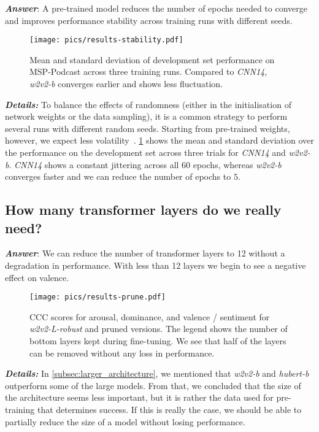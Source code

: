\documentclass{article}
\newcommand\cnn{\mbox{\emph{CNN14}}}
\newcommand\wbase{\mbox{\emph{w2v2-b}}}
\newcommand\hbase{\mbox{\emph{hubert-b}}}
\newcommand\wrobust{\mbox{\emph{w2v2-L-robust}}}
\newcommand\msppodcast{\mbox{MSP-Podcast}}
\begin{document}
\emph{\textbf{Answer}}:
A pre-trained model reduces the number of epochs needed to converge
and improves performance stability across training runs with different seeds.

\begin{figure}[t]
    \centering
    \texttt{[image: pics/results-stability.pdf]}
    \caption{
        Mean and standard deviation of development set performance on {\msppodcast} across three training runs.
        Compared to \emph{\cnn}, \emph{\wbase} converges earlier and shows less fluctuation.
}
    \label{fig:stability}
\end{figure}

\noindent
\emph{\textbf{Details:}}
To balance the effects of randomness
(either in the initialisation of network weights or the data sampling),
it is a common strategy to perform several runs with different random seeds. 
Starting from pre-trained weights, however, we expect less volatility~\citep{erhan2010does, neyshabur2020being}. 
\cref{fig:stability} shows the mean and standard deviation
over the performance on the development set across three trials for {\cnn} and {\wbase}. 
{\cnn} shows a constant jittering across all 60 epochs,
whereas {\wbase} converges faster
and we can reduce the number of epochs to $5$. 






\subsection{How many transformer layers do we really need?}
\label{subsec:prune}


\emph{\textbf{Answer}}:
We can reduce the number of transformer layers to 12 without a degradation in performance.
With less than 12 layers we begin to see a negative effect on valence.

\begin{figure}[t]
    \centering
    \texttt{[image: pics/results-prune.pdf]}
    \caption{
        \ac{CCC} scores for arousal, dominance, and valence / sentiment for \emph{\wrobust}
        and pruned versions.
        The legend shows the number of bottom layers kept during fine-tuning.
        We see that half of the layers can be removed without any loss in performance.
    }
    \label{fig:pruning}
\end{figure}

\noindent
\emph{\textbf{Details:}}
In \cref{subsec:larger_architecture},
we mentioned that {\wbase} and {\hbase} outperform some of the large models.
From that, we concluded that the size of the architecture seems less important,
but it is rather the data used for pre-training that determines success. 
If this is really the case,
we should be able to partially reduce the size of a model without losing performance.
\end{document}
